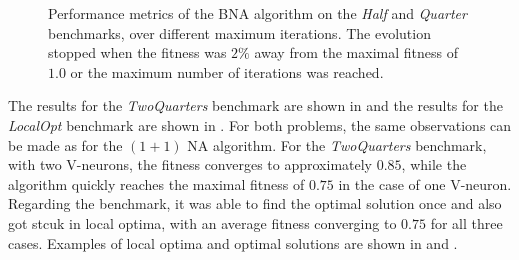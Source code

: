 \begin{figure}
\begin{center}
    \end{center}
    \caption{Performance metrics of the BNA algorithm on the \textit{Half} and \textit{Quarter} benchmarks, over different maximum iterations.
    The evolution stopped when the fitness was $2\%$ away from the maximal fitness of $1.0$ or the maximum number of iterations was reached.}
    \label{fig:bna_half_quarter}
\end{figure}

The results for the \textit{TwoQuarters} benchmark are shown in  and the results for the \textit{LocalOpt} benchmark are shown in .
For both problems, the same observations can be made as for the $(1 + 1)$ NA algorithm. For the \textit{TwoQuarters} benchmark, with two V-neurons, the fitness converges to approximately $0.85$,
while the algorithm quickly reaches the maximal fitness of $0.75$ in the case of one V-neuron. Regarding the  benchmark, it was able to find the optimal solution once and also
got stcuk in local optima, with an average fitness converging to $0.75$ for all three cases. Examples of local optima and optimal solutions are shown in 
and .

